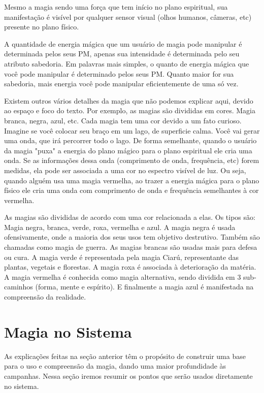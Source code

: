 Mesmo a magia sendo uma força que tem início no plano espiritual, sua manifestação é visível por qualquer sensor visual (olhos humanos, câmeras, etc) presente no plano físico.

A quantidade de energia mágica que um usuário de magia pode manipular é determinada pelos seus PM, apenas sua intensidade é determinada pelo seu atributo sabedoria. Em palavras mais simples, o quanto de energia mágica que você pode manipular é determinado pelos seus PM. Quanto maior for sua sabedoria, mais energia você pode manipular eficientemente de uma só vez.

Existem outros vários detalhes da magia que não podemos explicar aqui, devido ao espaço e foco do texto. Por exemplo, as magias são divididas em cores. Magia branca, negra, azul, etc. Cada magia tem uma cor devido a um fato curioso. Imagine se você colocar seu braço em um lago, de superficie calma. Você vai gerar uma onda, que irá percorrer todo o lago. De forma semelhante, quando o usuário da magia "puxa" a energia do plano mágico para o plano espiritual ele cria uma onda. Se as informações dessa onda (comprimento de onda, frequência, etc) forem medidas, ela pode ser associada a uma cor no espectro visível de luz. Ou seja, quando alguém usa uma magia vermelha, ao trazer a energia mágica para o plano físico ele cria uma onda com comprimento de onda e frequência semelhantes à cor vermelha.  


As magias são divididas de acordo com uma cor relacionada a elas. Os tipos são: Magia negra, branca, verde, roxa, vermelha e azul. A magia negra é usada ofensivamente, onde a maioria dos seus usos tem objetivo destrutivo. Também são chamadas como magia de guerra. As magias brancas são usadas mais para defesa ou cura. A magia verde é representada pela magia Ciarú, representante das plantas, vegetais e florestas. A magia roxa é associada à deterioração da matéria. A magia vermelha é conhecida como magia alternativa, sendo dividida em 3 sub-caminhos (forma, mente e espírito). E finalmente a magia azul é manifestada na compreensão da realidade. 

\section{Magia no Sistema}

As explicações feitas na seção anterior têm o propósito de construir uma base para o uso e compreensão da magia, dando uma maior profundidade às campanhas. Nessa seção iremos resumir os pontos que serão usados diretamente no sistema.

